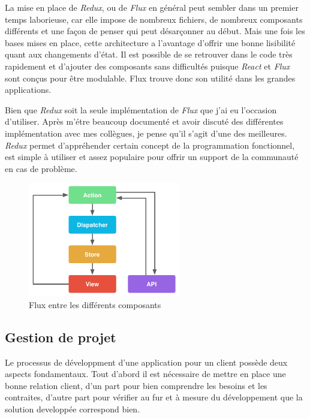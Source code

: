 \documentclass[12pt,a4paper]{article}
\begin{document}
  La mise en place de \emph{Redux}, ou de \emph{Flux} en général peut
  sembler dans un premier temps laborieuse, car elle impose de nombreux
  fichiers, de nombreux composants différents et une façon de penser qui
  peut désarçonner au début. Mais une fois les bases mises en place, cette
  architecture a l'avantage d'offrir une bonne lisibilité quant aux
  changements d'état. Il est possible de se retrouver dans le code très
  rapidement et d'ajouter des composants sans difficultés puisque
  \emph{React} et \emph{Flux} sont conçus pour être modulable. Flux trouve
  donc son utilité dans les grandes applications.

  \bigskip

  Bien que \emph{Redux} soit la seule implémentation de \emph{Flux} que
  j'ai eu l'occasion d'utiliser. Après m'étre beaucoup documenté et avoir
  discuté des différentes implémentation avec mes collègues, je pense
  qu'il s'agit d'une des meilleures. \emph{Redux} permet d'appréhender
  certain concept de la programmation fonctionnel, est simple à utiliser
  et assez populaire pour offrir un support de la communauté en cas de
  problème.

  \bigskip

  \begin{figure}[h]
    \centering
    \includegraphics[height=5cm]{figures/react.png}
    \caption{Flux entre les différents composants}
  \end{figure}

  \subsection{Gestion de projet}\label{gestion-de-projet}

  Le processus de développment d'une application pour un client possède
  deux aspects fondamentaux. Tout d'abord il est nécessaire de mettre en
  place une bonne relation client, d'un part pour bien comprendre les
  besoins et les contraites, d'autre part pour vérifier au fur et à mesure
  du développement que la solution developpée correspond bien.
\end{document}
